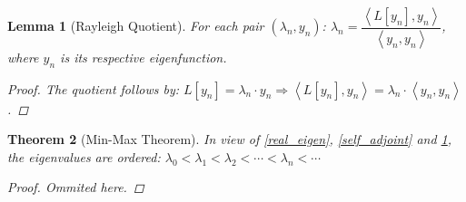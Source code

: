 \documentclass[12pt]{article}
\let\RA\Rightarrow
\newcommand{\inner}[2]{\left\langle{#1},{#2}\right\rangle}
\newtheorem{theorem}{Theorem}[subsection]
\newtheorem{lemma}[theorem]{Lemma}
\begin{document}
\begin{lemma}[Rayleigh Quotient]
  \label{rayleigh}
  For each pair $(\lambda_n,y_n)$: $\lambda_n=\dfrac{\inner{L[y_n]}{y_n}}{\inner{y_n}{y_n}}$, where $y_n$ is its respective eigenfunction.
  \begin{proof}
    The quotient follows by: $L[y_n]=\lambda_n\cdot y_n\RA\inner{L[y_n]}{y_n}=\lambda_n\cdot \inner{y_n}{y_n}$.
  \end{proof}
\end{lemma}

\begin{theorem}[Min-Max Theorem]
  In view of \ref{real_eigen}, \ref{self_adjoint} and \ref{rayleigh}, the eigenvalues are ordered: $\lambda_0<\lambda_1<\lambda_2<\cdots<\lambda_n<\cdots$
  \begin{proof}
    Ommited here.
  \end{proof}
\end{theorem}
\end{document}
